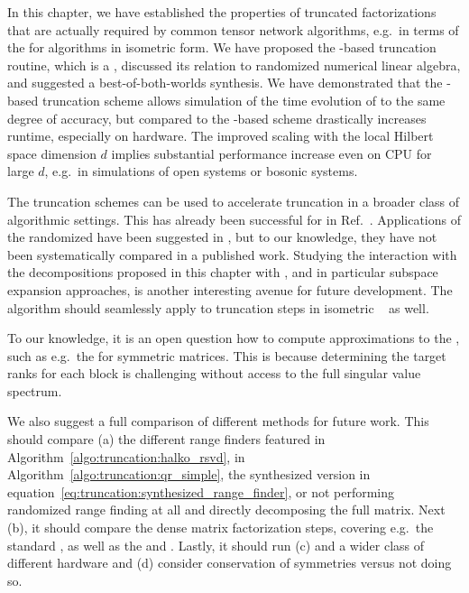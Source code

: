 In this chapter, we have established the properties of truncated factorizations that are actually required by common tensor network algorithms, e.g.~in terms of the  for  algorithms in isometric form.
%
We have proposed the -based truncation routine, which is a , discussed its relation to randomized numerical linear algebra, and suggested a best-of-both-worlds synthesis.
%
We have demonstrated that the -based truncation scheme allows simulation of the time evolution of  to the same degree of accuracy, but compared to the -based scheme drastically increases runtime, especially on  hardware.
%
The improved scaling with the local Hilbert space dimension $d$ implies substantial performance increase even on CPU for large $d$, e.g.~in simulations of open systems or bosonic systems.


The truncation schemes can be used to accelerate  truncation in a broader class of algorithmic settings.
%
This has already been successful for  in Ref.~\cite{hefel2023}.
%
Applications of the randomized  have been suggested in \cite{mcculloch2024}, but to our knowledge, they have not been systematically compared in a published work.
%
Studying the interaction with the decompositions proposed in this chapter with , and in particular subspace expansion approaches, is another interesting avenue for future development.
%
The algorithm should seamlessly apply to truncation steps in isometric ~\cite{zaletel2020, lin2022} as well.



To our knowledge, it is an open question how to compute approximations to the , such as e.g.~the  for symmetric matrices.
%
This is because determining the target ranks for each block is challenging without access to the full singular value spectrum.



We also suggest a full comparison of different methods for future work.
%
This should compare (a) the different range finders featured in Algorithm~\ref{algo:truncation:halko_rsvd}, in Algorithm~\ref{algo:truncation:qr_simple}, the synthesized version in equation~\eqref{eq:truncation:synthesized_range_finder}, or not performing randomized range finding at all and directly decomposing the full matrix.
%
Next (b), it should compare the dense matrix factorization steps, covering e.g.~the standard , as well as the  and .
%
Lastly, it should run (c) and a wider class of different hardware and (d) consider conservation of symmetries versus not doing so.
